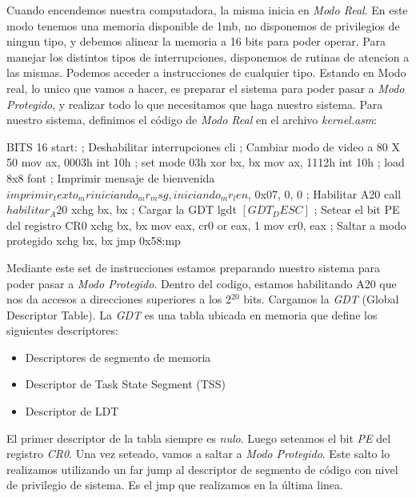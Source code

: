 Cuando encendemos nuestra computadora, la misma inicia en \textit{Modo Real}. En este modo tenemos una memoria disponible de 1mb, no disponemos de privilegios de ningun tipo, y debemos alinear la memoria a 16 bits para poder operar.
Para manejar los distintos tipos de interrupciones, disponemos de rutinas de atencion a las mismas. Podemos acceder a instrucciones de cualquier tipo.
Estando en Modo real, lo unico que vamos a hacer, es preparar el sistema para poder pasar a \textit{Modo Protegido}, y realizar todo lo que necesitamos que haga nuestro sistema.
Para nuestro sistema, definimos el c\'odigo de \textit{Modo Real} en el archivo \textit{kernel.asm}:

\begin{algorithmic}
\State \tab BITS 16
\State \tab start:
    \State \tab \tab ; Deshabilitar interrupciones
    \State \tab \tab cli
\newline
\State \tab \tab     ; Cambiar modo de video a 80 X 50
    \State \tab \tab mov ax, 0003h
    \State \tab \tab int 10h ; set mode 03h
    \State \tab \tab xor bx, bx
    \State \tab \tab mov ax, 1112h
    \State \tab \tab int 10h ; load 8x8 font
\newline
    \State \tab \tab ; Imprimir mensaje de bienvenida
    \State \tab \tab $imprimir_texto_mr iniciando_mr_msg, iniciando_mr_len$, 0x07, 0, 0
    \State \tab \tab ; Habilitar A20
    \State \tab \tab call $habilitar_A20$
    \State \tab \tab xchg bx, bx
    \State \tab \tab ; Cargar la GDT
    \State \tab \tab lgdt $[GDT_DESC]$
    \newline
    \State \tab \tab ; Setear el bit PE del registro CR0
    \State \tab \tab xchg bx, bx
    \State \tab \tab mov eax, cr0
    \State \tab \tab or eax, 1
    \State \tab \tab mov cr0, eax
    \newline
    \State \tab \tab ; Saltar a modo protegido
    \State \tab \tab xchg bx, bx
    \State \tab \tab jmp 0x58:mp
    
    \end{algorithmic}
    
Mediante este set de instrucciones estamos preparando nuestro sistema para poder pasar a \textit{Modo Protegido}.
Dentro del codigo, estamos habilitando A20 que nos da accesos a direcciones superiores a los 2$^{20}$ bits.\newline
Cargamos la \textit{GDT} (Global Descriptor Table).
La \textit{GDT} es una tabla ubicada en memoria que define los siguientes descriptores:
\begin{itemize}
    \item Descriptores de segmento de memoria
    \item Descriptor de Task State Segment (TSS)
    \item Descriptor de LDT
\end{itemize}
El primer descriptor de la tabla siempre es \textit{nulo}. Luego seteamos el bit \textit{PE} del registro \textit{CR0}.
\newline
Una vez seteado, vamos a saltar a \textit{Modo Protegido}. Este salto lo realizamos utilizando un far jump al descriptor de segmento de c\'odigo con nivel de privilegio de sistema. Es el jmp que realizamos en la \'ultima linea.


